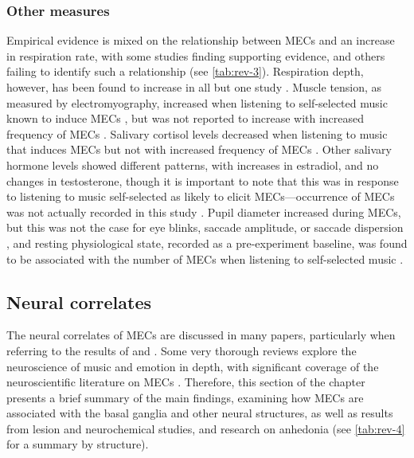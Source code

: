 \subsubsection{Other measures}

Empirical evidence is mixed on the relationship between MECs and an increase in respiration rate, with some studies finding supporting evidence, and others failing to identify such a relationship (see \autoref{tab:rev-3}). Respiration depth, however, has been found to increase in all \parencite{benedek2011, blood2001, grewe2009a} but one study \parencite{mori2017}. Muscle tension, as measured by electromyography, increased when listening to self-selected music known to induce MECs \parencite{blood2001}, but was not reported to increase with increased frequency of MECs \parencite{rickard2004}. Salivary cortisol levels decreased when listening to music that induces MECs \parencite{fukui2013} but not with increased frequency of MECs \parencite{rickard2004}. Other salivary hormone levels showed different patterns, with increases in estradiol, and no changes in testosterone, though it is important to note that this was in response to listening to music self-selected as likely to elicit MECs---occurrence of MECs was not actually recorded in this study \parencite{fukui2013}. Pupil diameter increased during MECs, but this was not the case for eye blinks, saccade amplitude, or saccade dispersion \parencite{laeng2016}, and resting physiological state, recorded as a pre-experiment baseline, was found to be associated with the number of MECs when listening to self-selected music \parencite{mori2014b}.



\subsection{Neural correlates}
\label{se:rev-results-5}

The neural correlates of MECs are discussed in many papers, particularly when referring to the results of \textcite{blood2001} and \textcite{salimpoor2011}. Some very thorough reviews explore the neuroscience of music and emotion in depth, with significant coverage of the neuroscientific literature on MECs \parencite[e.g.,][]{archie2013, brattico2013a, brattico2013b, chanda2013, habibi2014, koelsch2010, koelsch2014, salimpoor2013, schaefer2017, zatorre2003, zatorre2013, zatorre2015}. Therefore, this section of the chapter presents a brief summary of the main findings, examining how MECs are associated with the basal ganglia and other neural structures, as well as results from lesion and neurochemical studies, and research on anhedonia (see \autoref{tab:rev-4} for a summary by structure).

